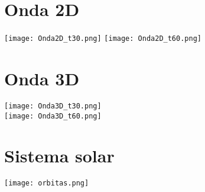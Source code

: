 \documentclass[paper=a4, fontsize=11pt]{scrartcl} %
\begin{document}


\section{Onda 2D}
\texttt{[image: Onda2D\_t30.png]}
\texttt{[image: Onda2D\_t60.png]}

\section{Onda 3D}
\texttt{[image: Onda3D\_t30.png]}\\
\texttt{[image: Onda3D\_t60.png]}

\section{Sistema solar}
\texttt{[image: orbitas.png]}
\end{document}
